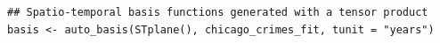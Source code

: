 \documentclass[12pt,a4paper]{article}
\begin{document}



\begin{minipage}{\linewidth}
\begin{lstlisting}[style=R]
## Spatio-temporal basis functions generated with a tensor product
basis <- auto_basis(STplane(), chicago_crimes_fit, tunit = "years")
\end{lstlisting}
\end{minipage}


%
%
\end{document}
